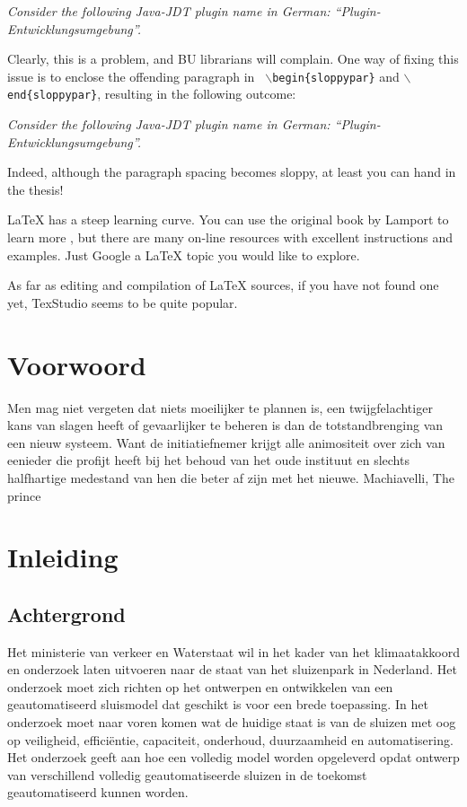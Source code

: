 \bigskip

{\it Consider the following Java-JDT plugin name in German: "`Plugin-Entwicklungsumgebung"'.}

\bigskip

Clearly, this is a problem, and BU librarians will complain. One way of fixing
this issue is to enclose the offending paragraph in {\tt
	$\backslash$begin\{sloppypar\}} and {\tt $\backslash$end\{sloppypar\}},
resulting in the following outcome:

\bigskip

\begin{sloppypar}
	{\it Consider the following Java-JDT plugin name in German:
		"`Plugin-Entwicklungsumgebung"'.}
\end{sloppypar}

\bigskip

Indeed, although the paragraph spacing becomes sloppy, at least you can hand in
the thesis!


LaTeX has a steep learning curve. You can use the original book by Lamport to
learn more \cite{lamport1985:latex}, but there are many on-line resources with
excellent instructions and examples. Just Google a LaTeX topic you would like to
explore.

As far as editing and compilation of LaTeX sources, if you have not found one
yet, TexStudio seems to be quite popular.


\chapter{Voorwoord}
Men mag niet vergeten dat niets moeilijker te plannen is, een twijgfelachtiger kans van slagen heeft of gevaarlijker te beheren is dan de totstandbrenging van een nieuw systeem. Want de initiatiefnemer krijgt alle animositeit over zich van eenieder die profijt heeft bij het behoud van het oude instituut en slechts halfhartige medestand van hen die beter af zijn met het nieuwe. Machiavelli, The prince
\chapter{Inleiding}
\section{Achtergrond}
 		Het ministerie van verkeer en Waterstaat wil in het kader van het klimaatakkoord en onderzoek laten uitvoeren naar de staat van het sluizenpark in Nederland. Het onderzoek moet zich richten op het ontwerpen en ontwikkelen van een geautomatiseerd sluismodel dat geschikt is voor een brede toepassing. In het onderzoek moet naar voren komen wat de huidige staat is van de sluizen met oog op veiligheid, efficiëntie, capaciteit, onderhoud, duurzaamheid en automatisering. Het onderzoek geeft aan hoe een volledig model worden opgeleverd opdat ontwerp van verschillend volledig geautomatiseerde sluizen in de toekomst geautomatiseerd kunnen worden.  

